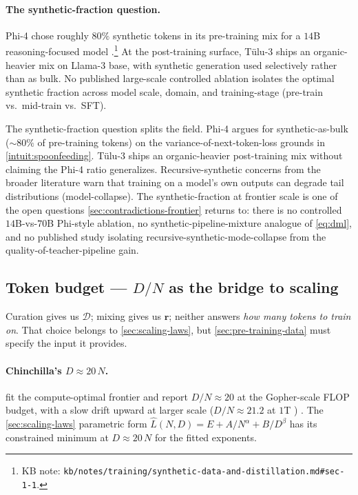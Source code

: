 \paragraph{The synthetic-fraction question.}
Phi-4 chose roughly $80\%$ synthetic tokens in its pre-training mix
for a $14$B reasoning-focused model
\citep[\S 1, \S 2.2]{phi4}.\footnote{KB note:
\texttt{kb/notes/training/synthetic-data-and-distillation.md\#sec-1-1}.}
At the post-training surface, Tülu-3 \citep{tulu3} ships an
organic-heavier mix on Llama-3 base, with synthetic generation used
selectively rather than as bulk. No published large-scale controlled
ablation isolates the optimal synthetic fraction across model scale,
domain, and training-stage (pre-train vs.\ mid-train vs.\ SFT).

\begin{contradiction}
\label{contra:synthetic-fraction}
The synthetic-fraction question splits the field. Phi-4
\citep[abstract]{phi4} argues for synthetic-as-bulk
($\sim\!80\%$ of pre-training tokens) on the
variance-of-next-token-loss grounds in
\cref{intuit:spoonfeeding}. Tülu-3 \citep{tulu3} ships an
organic-heavier post-training mix without claiming the Phi-4 ratio
generalizes. Recursive-synthetic concerns from the broader
literature \citep[\S 1]{phi4} warn that training on a model's own
outputs can degrade tail distributions
(model-collapse). The synthetic-fraction at frontier scale is one
of the open questions
\cref{sec:contradictions-frontier} returns to: there is no
controlled $14$B-vs-$70$B Phi-style ablation, no
synthetic-pipeline-mixture analogue of \cref{eq:dml}, and no
published study isolating
recursive-synthetic-mode-collapse from the
quality-of-teacher-pipeline gain.
\end{contradiction}

\subsection{Token budget --- $D / N$ as the bridge to scaling}
\label{sec:data-budget}

Curation gives us $\mathcal{D}$; mixing gives us $\mathbf{r}$;
neither answers \emph{how many tokens to train on}. That choice
belongs to \cref{sec:scaling-laws}, but \cref{sec:pre-training-data}
must specify the input it provides.

\paragraph{Chinchilla's $D \approx 20\,N$.}
\citet[\S 4.1, Table 4]{hoffmann2022-chinchilla} fit the
compute-optimal frontier and report $D / N \approx 20$ at the
Gopher-scale FLOP budget, with a slow drift upward at larger scale
($D / N \approx 21.2$ at $1$T )
\citep[\S 3, Table 3]{hoffmann2022-chinchilla}. The
\cref{sec:scaling-laws} parametric form
$\hat{L}(N, D) = E + A / N^{\alpha} + B / D^{\beta}$ has its
constrained minimum at $D \approx 20\,N$ for the fitted exponents.

